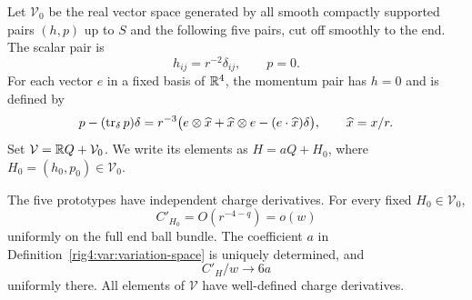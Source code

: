 \begin{definition}
\label{rig4:var:variation-space}
Let $\mathcal V_0$ be the real vector space generated by all smooth compactly
supported pairs $(h,p)$ up to $S$ and the following five pairs, cut off
smoothly to the end. The scalar pair is
\[
 h_{ij}=r^{-2}\delta_{ij},\qquad p=0.
\]
For each vector $e$ in a fixed basis of $\mathbb R^4$, the momentum pair has
$h=0$ and is defined by
\begin{equation}
 p-(\operatorname{tr}_\delta p)\delta
 =r^{-3}\bigl(e\otimes\widehat x+\widehat x\otimes e
                  -(e\cdot\widehat x)\delta\bigr),
 \qquad \widehat x=x/r.
\label{rig4:var:momentum-prototype}
\end{equation}
Set $\mathcal V=\mathbb R Q+\mathcal V_0$. We write its elements as
$H=aQ+H_0$, where $H_0=(h_0,p_0)\in\mathcal V_0$.
\end{definition}

\begin{lemma}
\label{rig4:var:end-variations}
The five prototypes have independent charge derivatives. For every fixed
$H_0\in\mathcal V_0$,
\begin{equation}
 C'_{H_0}=O(r^{-4-q})=o(w)
\label{rig4:var:prototype-constraint-decay}
\end{equation}
uniformly on the full end ball bundle. The coefficient $a$ in
Definition~\ref{rig4:var:variation-space} is uniquely determined, and
\begin{equation}
 C'_H/w\longrightarrow6a
\label{rig4:var:end-value}
\end{equation}
uniformly there. All elements of $\mathcal V$ have well-defined charge
derivatives.
\end{lemma}

